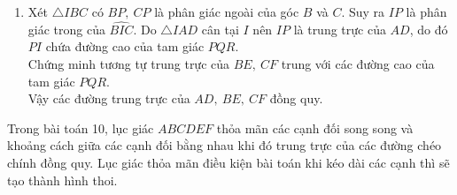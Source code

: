 \begin{bt}
{\begin{enumerate}
{}
Giả sử các đường chéo chính của lục giác $ABCDEF$ cắt nhau tạo thành $\triangle PQR$.\\
Xét $\triangle CPB$ có $\widehat{C_1}+\widehat{B_1}+\widehat{BPC}=180^\circ.$ Ta thấy $$2\widehat{C_1}+2\widehat{B_1}+\widehat{C_2}+\widehat{B_2}=360^\circ.$$
Vì $\triangle IBC$ vuông tại $I$ nên 
$$\widehat{C_2}+\widehat{B_2}=90^\circ \Rightarrow 2\left(\widehat{B_2}+\widehat{C_2} \right)=270^\circ.$$
Từ đó, suy ra $\widehat{BPC}=45^\circ$. Vậy góc nhọn tạo bởi $BE$ và $CF$ bằng $45^\circ$.
\item Xét $\triangle IBC$ có $BP,\ CP$ là phân giác ngoài của góc $B$ và $C$. Suy ra $IP$ là phân giác trong của $\widehat{BIC}$. Do $\triangle IAD$ cân tại $I$ nên $IP$ là trung trực của $AD$, do đó $PI$ chứa đường cao của tam giác $PQR$.\\
Chứng minh tương tự trung trực của $BE,\ CF$ trung với các đường cao của tam giác $PQR$.\\
Vậy các đường trung trực của $AD,\ BE,\ CF$ đồng quy.
\end{enumerate}
\begin{nx}
Trong bài toán 10, lục giác $ABCDEF$ thỏa mãn các cạnh đối song song và khoảng cách giữa các cạnh đối bằng nhau khi đó trung trực của các đường chéo chính đồng quy. Lục giác thỏa mãn điều kiện bài toán khi kéo dài các cạnh thì sẽ tạo thành hình thoi.
\end{nx}
}

\end{bt}
